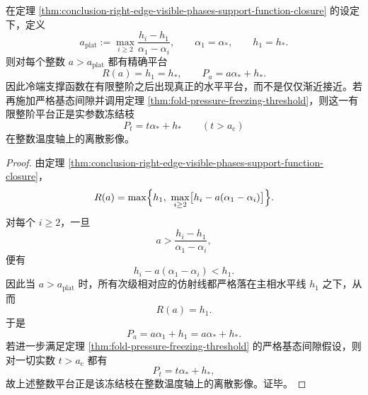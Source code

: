 \begin{theorem}[冷端支撑函数的有限整阶平台]\label{thm:conclusion-coldend-support-function-finite-integer-plateau}
在定理 \ref{thm:conclusion-right-edge-visible-phases-support-function-closure} 的设定下，定义
\[
a_{\mathrm{plat}}
:=
\max_{i\ge2}\frac{h_i-h_1}{\alpha_1-\alpha_i},
\qquad
\alpha_1=\alpha_\ast,
\qquad
h_1=h_\ast.
\]
则对每个整数 \(a>a_{\mathrm{plat}}\) 都有精确平台
\[
R(a)=h_1=h_\ast,
\qquad
P_a=a\alpha_\ast+h_\ast.
\]
因此冷端支撑函数在有限整阶之后出现真正的水平平台，而不是仅仅渐近接近。若再施加严格基态间隙并调用定理 \ref{thm:fold-pressure-freezing-threshold}，则这一有限整阶平台正是实参数冻结枝
\[
P_t=t\alpha_\ast+h_\ast
\qquad (t>a_{\mathrm c})
\]
在整数温度轴上的离散影像。
\end{theorem}
\begin{proof}
由定理 \ref{thm:conclusion-right-edge-visible-phases-support-function-closure}，
\[
R(a)=\max\Bigl\{h_1,\ \max_{i\ge2}\bigl[h_i-a(\alpha_1-\alpha_i)\bigr]\Bigr\}.
\]
对每个 \(i\ge2\)，一旦
\[
a>\frac{h_i-h_1}{\alpha_1-\alpha_i},
\]
便有
\[
h_i-a(\alpha_1-\alpha_i)<h_1.
\]
因此当 \(a>a_{\mathrm{plat}}\) 时，所有次级相对应的仿射线都严格落在主相水平线 \(h_1\) 之下，从而
\[
R(a)=h_1.
\]
于是
\[
P_a=a\alpha_1+h_1=a\alpha_\ast+h_\ast.
\]
若进一步满足定理 \ref{thm:fold-pressure-freezing-threshold} 的严格基态间隙假设，则对一切实数 \(t>a_{\mathrm c}\) 都有
\[
P_t=t\alpha_\ast+h_\ast,
\]
故上述整数平台正是该冻结枝在整数温度轴上的离散影像。证毕。
\end{proof}
